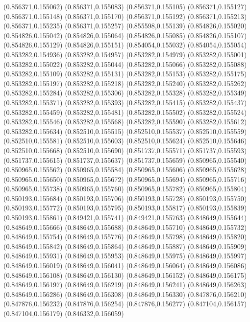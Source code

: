 (0.856371,0.155062)
(0.856371,0.155083)
(0.856371,0.155105)
(0.856371,0.155127)
(0.856371,0.155148)
(0.856371,0.155170)
(0.856371,0.155192)
(0.856371,0.155213)
(0.856371,0.155235)
(0.856371,0.155257)
(0.855598,0.155139)
(0.854826,0.155020)
(0.854826,0.155042)
(0.854826,0.155064)
(0.854826,0.155085)
(0.854826,0.155107)
(0.854826,0.155129)
(0.854826,0.155151)
(0.854054,0.155032)
(0.854054,0.155054)
(0.853282,0.154936)
(0.853282,0.154957)
(0.853282,0.154979)
(0.853282,0.155001)
(0.853282,0.155022)
(0.853282,0.155044)
(0.853282,0.155066)
(0.853282,0.155088)
(0.853282,0.155109)
(0.853282,0.155131)
(0.853282,0.155153)
(0.853282,0.155175)
(0.853282,0.155197)
(0.853282,0.155218)
(0.853282,0.155240)
(0.853282,0.155262)
(0.853282,0.155284)
(0.853282,0.155306)
(0.853282,0.155328)
(0.853282,0.155349)
(0.853282,0.155371)
(0.853282,0.155393)
(0.853282,0.155415)
(0.853282,0.155437)
(0.853282,0.155459)
(0.853282,0.155481)
(0.853282,0.155502)
(0.853282,0.155524)
(0.853282,0.155546)
(0.853282,0.155568)
(0.853282,0.155590)
(0.853282,0.155612)
(0.853282,0.155634)
(0.852510,0.155515)
(0.852510,0.155537)
(0.852510,0.155559)
(0.852510,0.155581)
(0.852510,0.155603)
(0.852510,0.155624)
(0.852510,0.155646)
(0.852510,0.155668)
(0.852510,0.155690)
(0.851737,0.155571)
(0.851737,0.155593)
(0.851737,0.155615)
(0.851737,0.155637)
(0.851737,0.155659)
(0.850965,0.155540)
(0.850965,0.155562)
(0.850965,0.155584)
(0.850965,0.155606)
(0.850965,0.155628)
(0.850965,0.155650)
(0.850965,0.155672)
(0.850965,0.155694)
(0.850965,0.155716)
(0.850965,0.155738)
(0.850965,0.155760)
(0.850965,0.155782)
(0.850965,0.155804)
(0.850193,0.155684)
(0.850193,0.155706)
(0.850193,0.155728)
(0.850193,0.155750)
(0.850193,0.155772)
(0.850193,0.155795)
(0.850193,0.155817)
(0.850193,0.155839)
(0.850193,0.155861)
(0.849421,0.155741)
(0.849421,0.155763)
(0.848649,0.155644)
(0.848649,0.155666)
(0.848649,0.155688)
(0.848649,0.155710)
(0.848649,0.155732)
(0.848649,0.155754)
(0.848649,0.155776)
(0.848649,0.155798)
(0.848649,0.155820)
(0.848649,0.155842)
(0.848649,0.155864)
(0.848649,0.155887)
(0.848649,0.155909)
(0.848649,0.155931)
(0.848649,0.155953)
(0.848649,0.155975)
(0.848649,0.155997)
(0.848649,0.156019)
(0.848649,0.156041)
(0.848649,0.156064)
(0.848649,0.156086)
(0.848649,0.156108)
(0.848649,0.156130)
(0.848649,0.156152)
(0.848649,0.156175)
(0.848649,0.156197)
(0.848649,0.156219)
(0.848649,0.156241)
(0.848649,0.156263)
(0.848649,0.156286)
(0.848649,0.156308)
(0.848649,0.156330)
(0.847876,0.156210)
(0.847876,0.156232)
(0.847876,0.156254)
(0.847876,0.156277)
(0.847104,0.156157)
(0.847104,0.156179)
(0.846332,0.156059)

